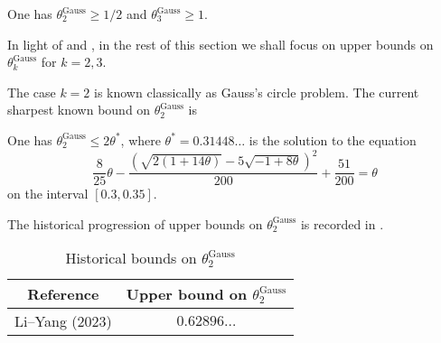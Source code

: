 \begin{theorem}\label{gauss-circle-lower-23}
One has $\theta^{\operatorname{Gauss}}_{2} \ge 1/2$ and $\theta^{\operatorname{Gauss}}_{3} \ge 1$.
\end{theorem}

In light of  and , in the rest of this section we shall focus on upper bounds on $\theta^{\operatorname{Gauss}}_{k}$ for $k = 2, 3$.

The case $k = 2$ is known classically as Gauss's circle problem. The current sharpest known bound on $\theta_2^{\operatorname{Gauss}}$ is
\begin{theorem} 
One has $\theta_2^{\operatorname{Gauss}} \le 2\theta^*$, where $\theta^* = 0.31448\ldots$ is the solution to the equation
\[
\frac{8}{25}\theta - \frac{(\sqrt{2(1+14\theta)} - 5\sqrt{-1+8\theta})^2}{200} + \frac{51}{200} = \theta
\]
on the interval $[0.3, 0.35]$.
\end{theorem}

The historical progression of upper bounds on $\theta_2^{\operatorname{Gauss}}$ is recorded in .


\begin{table}[ht]
    \def\arraystretch{1.2}
    \centering
    \caption{Historical bounds on $\theta_2^{\operatorname{Gauss}}$}
    \begin{tabular}{|c|c|}
    \hline
    Reference & Upper bound on $\theta_2^{\operatorname{Gauss}}$\\
    \hline 
    Li--Yang (2023) \cite{li_yang_gauss_2024} & $0.62896\ldots$\\
    \hline 
    \end{tabular}
\label{gauss-circle-table-2}
\end{table}

